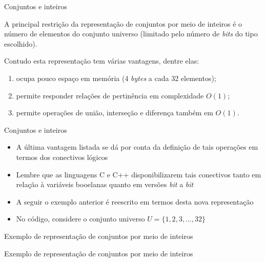 \begin{frame}[fragile]{Conjuntos e inteiros}

        A principal restrição da representação de conjuntos por meio de inteiros é o número de elementos do conjunto universo (limitado pelo número de
            \textit{bits} do tipo escolhido).

\vspace{0.1in}

        Contudo esta representação tem várias vantagens, dentre elas:

\begin{enumerate}
    \item ocupa pouco espaço em memória (4 \textit{bytes} a cada 32 elementos);
    \item permite responder relações de pertinência em complexidade $O(1)$;
    \item permite operações de união, interseção e diferença também em $O(1)$.
\end{enumerate}

\end{frame}

\begin{frame}[fragile]{Conjuntos e inteiros}

    \begin{itemize}
        \item A última vantagem listada se dá por conta da definição de tais operações em termos dos conectivos lógicos

        \item Lembre que as linguagens C e C++ disponibilizarem tais conectivos tanto em relação à variáveis booelanas quanto em versões \textit{bit} a 
            \textit{bit}

        \item A seguir o exemplo anterior é reescrito em termos desta nova representação

        \item No código, considere o conjunto universo $U = \{1, 2, 3, \ldots, 32\}$
    \end{itemize}

\end{frame}

\begin{frame}[fragile]{Exemplo de representação de conjuntos por meio de inteiros}
\end{frame}

\begin{frame}[fragile]{Exemplo de representação de conjuntos por meio de inteiros}
\end{frame}

